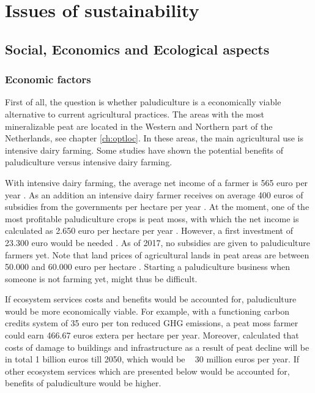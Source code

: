 {%

\chapter{Issues of sustainability} \label{ch:sust}

\section{Social, Economics and Ecological aspects}

\subsection{Economic factors}
First of all, the question is whether paludiculture is a economically viable alternative to current agricultural practices. The areas with the most mineralizable peat are located in the Western and Northern part of the Netherlands, see chapter \ref{ch:optloc}. In these areas, the main agricultural use is intensive dairy farming. Some studies have shown the potential benefits of paludiculture versus intensive dairy farming. 

With intensive dairy farming, the average net income of a farmer is 565 euro per year \citep{van2013rewetting}. As an addition an intensive dairy farmer receives on average 400 euros of subsidies from the governments per hectare per year \citep{van2013rewetting}. At the moment, one of the most profitable paludiculture crops is peat moss, with which the net income is calculated as 2.650 euro per hectare per year \citep{van2013rewetting}. However, a first investment of 23.300 euro would be needed \citep{van2013rewetting}. As of 2017, no subsidies are given to paludiculture farmers yet. Note that land prices of agricultural lands in peat areas are between 50.000 and 60.000 euro per hectare \citep{}. Starting a paludiculture business when someone is not farming yet, might thus be difficult.

If ecosystem services costs and benefits would be accounted for, paludiculture would be more economically viable. For example, with a functioning carbon credits system of 35 euro per ton reduced GHG emissions, a peat moss farmer could earn 466.67 euros extera per hectare per year. Moreover, \citet{van2016dalende} calculated that costs of damage to buildings and infrastructure as a result of peat decline will be in total 1 billion euros till 2050, which would be ~ 30 million euros per year. If other ecosystem services which are presented below would be accounted for, benefits of paludiculture would be higher.

}

